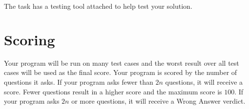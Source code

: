 The task has a testing tool attached to help test your solution.

\section*{Scoring}
Your program will be run on many test cases and the worst result over all test cases will be used as the final score.
Your program is scored by the number of questions it asks.
If your program asks fewer than $2n$ questions, it will receive a score.
Fewer questions result in a higher score and the maximum score is $100$.
If your program asks $2n$ or more questions, it will receive a Wrong Answer verdict.

